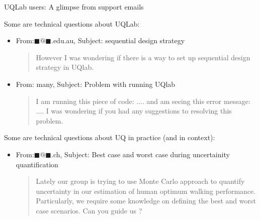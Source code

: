 \documentclass[]{rsuqbeamernew}
\begin{document}
\begin{frame}{UQLab users: A glimpse from support emails}
  
  Some are technical questions about UQLab:
  \begin{itemize}
    \item From:$\blacksquare@\blacksquare$.edu.au, Subject: sequential design strategy
    \begin{quotation}
      However I was wondering if there is a way to set up sequential design strategy in UQlab. 
    \end{quotation}
    \item From: many, Subject: Problem with running UQlab
    \begin{quotation}
      I am running this piece of code:
      ....
      and am seeing this error message:
      ....
      I was wondering if you had any suggestions to resolving this problem.
    \end{quotation}
  \end{itemize}

  Some are technical questions about UQ in practice (and in context):
  \begin{itemize}
      \item From:$\blacksquare@\blacksquare$.ch, Subject: Best case and worst case during uncertainity quantification
      \begin{quotation}
      Lately our group is trying to use Monte Carlo approach to quantify uncertainty in our estimation of human optimum walking performance.
      Particularly, we require some knowledge on defining the best and worst case scenarios.
      Can you guide us ? 
    \end{quotation}
  \end{itemize}


\end{frame}
\end{document}
